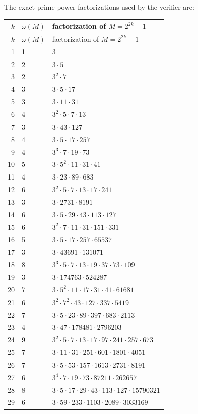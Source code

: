 \documentclass[11pt]{article}
\begin{document}
The exact prime-power factorizations used by the verifier are:

\begin{longtable}{r p{1.2cm} p{11cm}}
\toprule
\(k\) & \(\omega(M)\) & factorization of \(M=2^{2k}-1\)\\
\midrule
\endfirsthead
\toprule
\(k\) & \(\omega(M)\) & factorization of \(M=2^{2k}-1\)\\
\midrule
\endhead
1 & 1 & \(3\) \\
2 & 2 & \(3\cdot 5\) \\
3 & 2 & \(3^{2}\cdot 7\) \\
4 & 3 & \(3\cdot 5\cdot 17\) \\
5 & 3 & \(3\cdot 11\cdot 31\) \\
6 & 4 & \(3^{2}\cdot 5\cdot 7\cdot 13\) \\
7 & 3 & \(3\cdot 43\cdot 127\) \\
8 & 4 & \(3\cdot 5\cdot 17\cdot 257\) \\
9 & 4 & \(3^{3}\cdot 7\cdot 19\cdot 73\) \\
10 & 5 & \(3\cdot 5^{2}\cdot 11\cdot 31\cdot 41\) \\
11 & 4 & \(3\cdot 23\cdot 89\cdot 683\) \\
12 & 6 & \(3^{2}\cdot 5\cdot 7\cdot 13\cdot 17\cdot 241\) \\
13 & 3 & \(3\cdot 2731\cdot 8191\) \\
14 & 6 & \(3\cdot 5\cdot 29\cdot 43\cdot 113\cdot 127\) \\
15 & 6 & \(3^{2}\cdot 7\cdot 11\cdot 31\cdot 151\cdot 331\) \\
16 & 5 & \(3\cdot 5\cdot 17\cdot 257\cdot 65537\) \\
17 & 3 & \(3\cdot 43691\cdot 131071\) \\
18 & 8 & \(3^{3}\cdot 5\cdot 7\cdot 13\cdot 19\cdot 37\cdot 73\cdot 109\) \\
19 & 3 & \(3\cdot 174763\cdot 524287\) \\
20 & 7 & \(3\cdot 5^{2}\cdot 11\cdot 17\cdot 31\cdot 41\cdot 61681\) \\
21 & 6 & \(3^{2}\cdot 7^{2}\cdot 43\cdot 127\cdot 337\cdot 5419\) \\
22 & 7 & \(3\cdot 5\cdot 23\cdot 89\cdot 397\cdot 683\cdot 2113\) \\
23 & 4 & \(3\cdot 47\cdot 178481\cdot 2796203\) \\
24 & 9 & \(3^{2}\cdot 5\cdot 7\cdot 13\cdot 17\cdot 97\cdot 241\cdot 257\cdot 673\) \\
25 & 7 & \(3\cdot 11\cdot 31\cdot 251\cdot 601\cdot 1801\cdot 4051\) \\
26 & 7 & \(3\cdot 5\cdot 53\cdot 157\cdot 1613\cdot 2731\cdot 8191\) \\
27 & 6 & \(3^{4}\cdot 7\cdot 19\cdot 73\cdot 87211\cdot 262657\) \\
28 & 8 & \(3\cdot 5\cdot 17\cdot 29\cdot 43\cdot 113\cdot 127\cdot 15790321\) \\
29 & 6 & \(3\cdot 59\cdot 233\cdot 1103\cdot 2089\cdot 3033169\) \\
\bottomrule
\end{longtable}
\end{document}
